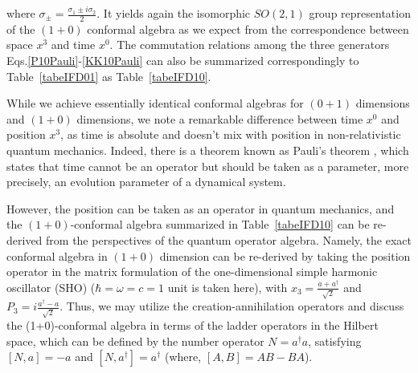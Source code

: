 \documentclass[%
 reprint,
superscriptaddress,
 amsmath,amssymb,
 aps,
]{revtex4-2}
\begin{document}
where $\sigma_{\pm}=\frac{\sigma_{1}\pm i\sigma_{2}}{2}$. 
It yields again the isomorphic $SO(2,1)$ group representation of the $(1+0)$ conformal algebra as we expect from the correspondence between space $x^3$ and time $x^0$. The commutation relations among the three generators Eqs.\eqref{P10Pauli}-\eqref{KK10Pauli} can also be summarized correspondingly to Table~\ref{tabeIFD01} as 
Table~\ref{tabeIFD10}.   

\begin{table}[h!]
\centering
\caption{\label{tabeIFD10}$1+0$ conformal algebra in IFD}
\end{table}

While we achieve essentially identical conformal algebras for $(0+1)$ dimensions and $(1+0)$ dimensions, we note a remarkable difference between time $x^0$ and position $x^3$, as time is absolute and doesn't mix with position in non-relativistic quantum mechanics. Indeed, there is a theorem known as Pauli's theorem \cite{Pauli1980}, which states that time cannot be an operator but should be taken as a parameter, more precisely, an evolution parameter of a dynamical system.   

However, the position can be taken as an operator in quantum mechanics, and the $(1+0)$-conformal algebra summarized in Table~\ref{tabeIFD10} can be re-derived from the perspectives of the quantum operator algebra. Namely, the exact conformal algebra in $(1+0)$ dimension can be re-derived by taking the position operator in the matrix formulation of the one-dimensional simple harmonic oscillator (SHO) ($\hbar=\omega=c=1$ unit is taken here), with $x_3=\frac{a+a^{\dagger}}{\sqrt{2}}$ and $P_3=i\frac{a^{\dagger}-a}{\sqrt{2}}$.
Thus, we may utilize the creation-annihilation operators and discuss the (1+0)-conformal algebra in terms of the ladder operators in the Hilbert space, which can be defined by the number operator $N=a^{\dagger} a$, satisfying $[N, a] = -a$ and $[N,a^{\dagger}]= a^\dagger$ (where, $[A,B]=AB-BA$). 
\end{document}
